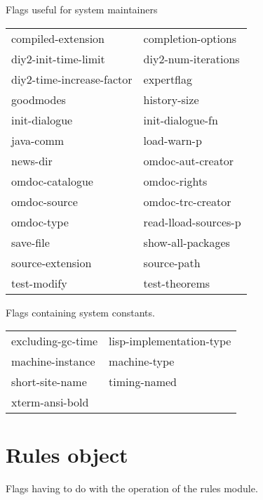 \begin{description} 
\item[MAINTAIN]  
Flags useful for system maintainers

\begin{tabular}{l l}
compiled-extension&completion-options\\
diy2-init-time-limit&diy2-num-iterations\\
diy2-time-increase-factor&expertflag\\
goodmodes&history-size\\
init-dialogue&init-dialogue-fn\\
java-comm&load-warn-p\\
news-dir&omdoc-aut-creator\\
omdoc-catalogue&omdoc-rights\\
omdoc-source&omdoc-trc-creator\\
omdoc-type&read-lload-sources-p\\
save-file&show-all-packages\\
source-extension&source-path\\
test-modify&test-theorems\\
\end{tabular}

\item[SYSTEM]  
Flags containing system constants.

\begin{tabular}{l l}
excluding-gc-time&lisp-implementation-type\\
machine-instance&machine-type\\
short-site-name&timing-named\\
xterm-ansi-bold
\end{tabular}
\item
\end{description}

\section{Rules object}

\begin{description} 
\item[RULES-MOD]  
Flags having to do with the operation of the rules module.

\begin{tabular}{l l}
\end{tabular}
\item
\end{description}

